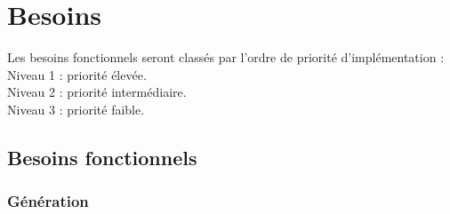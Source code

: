 \documentclass[a4paper,12pt]{article}
\begin{document}
\section{Besoins}

\noindent Les besoins fonctionnels seront classés par l'ordre de priorité d'implémentation :\\
Niveau 1 : priorité élevée.\\
Niveau 2 : priorité intermédiaire.\\
Niveau 3 : priorité faible.

\subsection{Besoins fonctionnels}


\subsubsection{Génération}
\end{document}
